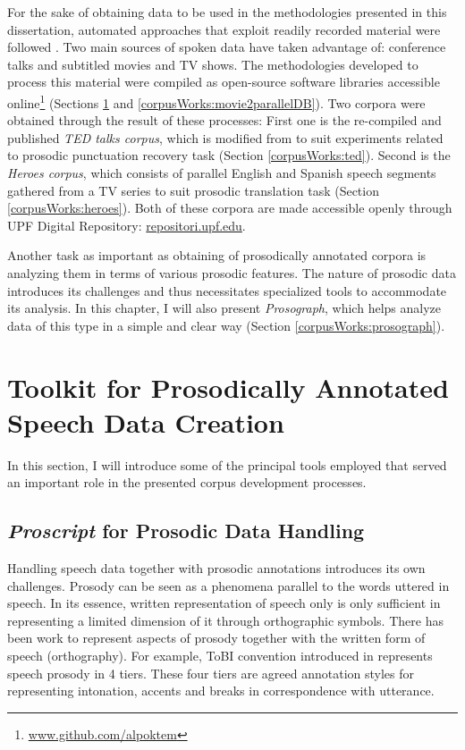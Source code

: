 For the sake of obtaining data to be used in the methodologies presented in this dissertation, automated approaches that exploit readily recorded material were followed \cite{bucc, Oktem2018}. Two main sources of spoken data have taken advantage of: conference talks and subtitled movies and TV shows. The methodologies developed to process this material were compiled as open-source software libraries accessible online\footnote{\url{www.github.com/alpoktem}} (Sections \ref{corpusWorks:toolkit} and \ref{corpusWorks:movie2parallelDB}). Two corpora were obtained through the result of these processes: First one is the re-compiled and published \textit{TED talks corpus}, which is modified from \cite{Farrus:SP:2016} to suit experiments related to prosodic punctuation recovery task (Section \ref{corpusWorks:ted}). Second is the \textit{Heroes corpus}, which consists of parallel English and Spanish speech segments gathered from a TV series to suit prosodic translation task (Section \ref{corpusWorks:heroes}). Both of these corpora are made accessible openly through UPF Digital Repository: \url{repositori.upf.edu}. 

Another task as important as obtaining of prosodically annotated corpora is analyzing them in terms of various prosodic features. The nature of prosodic data introduces its challenges and thus necessitates specialized tools to accommodate its analysis. In this chapter, I will also present \textit{Prosograph}, which helps analyze data of this type in a simple and clear way (Section \ref{corpusWorks:prosograph}). 

\section{Toolkit for Prosodically Annotated Speech Data Creation}
\label{corpusWorks:toolkit}

In this section, I will introduce some of the principal tools employed that served an important role in the presented corpus development processes. 

\subsection*{\textit{Proscript} for Prosodic Data Handling}
Handling speech data together with prosodic annotations introduces its own challenges. Prosody can be seen as a phenomena parallel to the words uttered in speech. In its essence, written representation of speech only is only sufficient in representing a limited dimension of it through orthographic symbols. There has been work to represent aspects of prosody together with the written form of speech (orthography). For example, ToBI convention introduced in \cite{tobi} represents speech prosody in 4 tiers. These four tiers are agreed annotation styles for representing intonation, accents and breaks in correspondence with utterance. 

